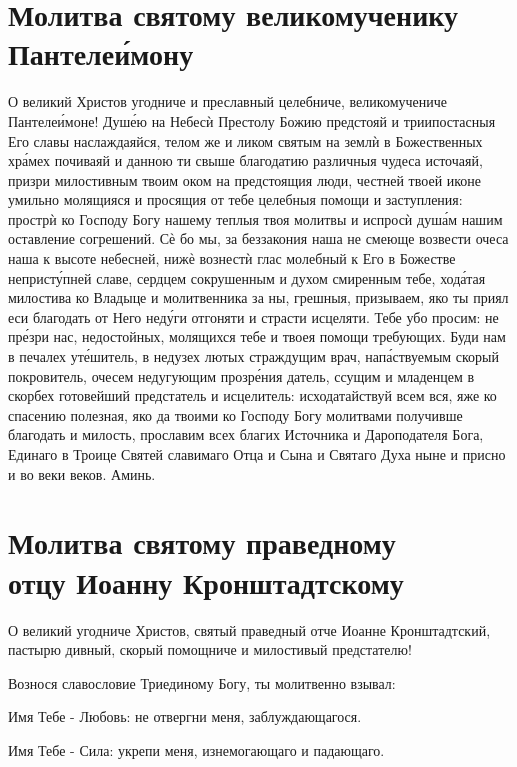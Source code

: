 \documentclass[12pt,twoside,xdvi,a6paper,civil=times]{hipbook}
\renewcommand{\*}{\raise3pt\hbox{\footnotesize*}}
\begin{document}
\civil
\section[\civil Молитва св. вмч. Пантелеимону]
{Молитва святому великомученику Пантеле\'имону}

О великий Христов угодниче и преславный целебниче, великомучениче
Пантеле\'имоне! Ду\-ш\'ею на Небес\`и Престолу Божию предстояй и триипостасныя
Его славы наслаждаяйся, телом же и ликом святым на земл\`и в Божественных
хр\'амех почиваяй и данною ти свыше благодатию различныя чудеса источаяй,
призри милостивным твоим оком на предстоящия люди, честней твоей иконе умильно
молящияся и просящия от тебе целебныя помощи и заступления: простр\`и ко
Господу Богу нашему теплыя твоя молитвы и испрос\`и душ\'ам нашим оставление
согрешений. С\`е бо мы, за беззакония наша не смеюще возвести очеса наша к
высоте небесней, ниж\`е вознест\`и глас молебный к Его в Божестве
неприст\'упней сла\-ве, сердцем сокрушенным и духом смиренным тебе, ход\'атая
милостива ко Владыце и молитвенника за ны, грешныя, призываем, яко ты приял
еси благодать от Него нед\'уги отгоняти и страсти исцеляти. Тебе убо просим: не
пр\'езри нас, недостойных, молящихся тебе и твоея помощи требующих. Буди нам в
печалех ут\'ешитель, в недузех лютых страждущим врач, нап\'аствуемым скорый
покровитель, очесем недугующим прозр\'ения датель, ссущим и младенцем в скорбех
готовейший предстатель и исцелитель: исходатайствуй всем вся, яже ко спасению
полезная, яко да твоими ко Господу Богу молитвами получивше благодать и
милость, прославим всех благих Источника и Дароподателя Бога, Единаго в Троице
Святей славимаго Отца и Сына и Святаго Духа ныне и присно и во веки веков.
Аминь.

\section[\civil Молитва св. прав. Иоанну Кронштадтскому]
{Молитва святому праведному\\отцу Иоанну Кронштадтскому}

О великий угодниче Христов, святый праведный отче Иоанне Кронштадтский,
пастырю дивный, скорый помощниче и милостивый пред\-ста\-те\-лю!

Вознося славословие Триединому Богу, ты молитвенно взывал:

Имя Тебе - Любовь: не отвергни меня, заблуждающагося.

Имя Тебе - Сила: укрепи меня, изнемогающаго и падающаго.
\end{document}
